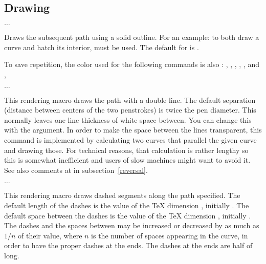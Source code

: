 \documentclass[letterpaper]{article}
\begin{document}
\subsection{Drawing}\label{drawing}

\begin{cd}
$\ldots$%
\end{cd}

Draws the subsequent path using a solid outline. For an example: to both
draw a curve and hatch its interior,  must be used.
The default for  is .

To save repetition, the color used for the following commands is also
: , , , ,
, and ,

\begin{cd}
$\ldots$
\end{cd}

This rendering macro draws the path with a double line. The default
separation (distance between centers of the two penstrokes) is twice the
pen diameter. This normally leaves one line thickness of white space
between. You can change this with the  argument. In
order to make the space between the lines transparent, this command is
implemented by calculating two curves that parallel the given curve and
drawing those. For technical reasons, that calculation is rather lengthy
so this is somewhat inefficient and users of slow machines might want to
avoid it. See also comments at  in
subsection~\ref{reversal}.

\begin{cd}
$\ldots$%
\end{cd}

This rendering macro draws dashed segments along the path specified.
The default length of the dashes is the value of the \TeX{} dimension
, initially \dim{4pt}. The default space between the dashes
is the value of the \TeX{} dimension , initially
\dim{4pt}. The dashes and the spaces between may be increased or
decreased by as much as $1/n$ of their value, where $n$ is the number of
spaces appearing in the curve, in order to have the proper dashes at the
ends. The dashes at the ends are half of  long.
\end{document}
